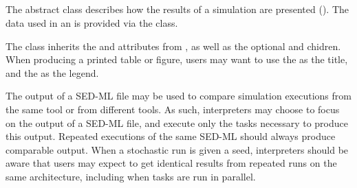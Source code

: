\subsection{}
\label{class:output}

The abstract \Output class describes how the results of a simulation are presented ().  The data used in an \Output is provided via the \DataGenerator class.


\begin{blockChanged}
The \Output class inherits the  and  attributes from \SedBase, as well as the optional  and  chidren.  When producing a printed table or figure, users may want to use the  as the title, and the  as the legend.
\end{blockChanged}

\begin{blockChanged}
The output of a SED-ML file may be used to compare simulation executions from the same tool or from different tools.  As such, interpreters may choose to focus on the output of a SED-ML file, and execute only the tasks necessary to produce this output.  Repeated executions of the same SED-ML should always produce comparable output.  When a stochastic run is given a seed, interpreters should be aware that users may expect to get identical results from repeated runs on the same architecture, including when tasks are run in parallel.
\end{blockChanged}

